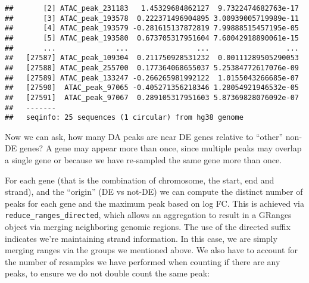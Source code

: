 \documentclass[
  9pt,
  a4paper,
]{extarticle}
\newenvironment{Shaded}{\begin{snugshade}}{\end{snugshade}}
\newcommand{\DataTypeTok}[1]{\textcolor[rgb]{0.13,0.29,0.53}{#1}}
\newcommand{\KeywordTok}[1]{\textcolor[rgb]{0.13,0.29,0.53}{\textbf{#1}}}
\newcommand{\NormalTok}[1]{#1}
\newcommand{\OperatorTok}[1]{\textcolor[rgb]{0.81,0.36,0.00}{\textbf{#1}}}
\newcommand{\StringTok}[1]{\textcolor[rgb]{0.31,0.60,0.02}{#1}}
\begin{document}
\begin{verbatim}
##       [2] ATAC_peak_231183   1.45329684862127  9.7322474682763e-17
##       [3] ATAC_peak_193578  0.222371496904895 3.00939005719989e-11
##       [4] ATAC_peak_193579 -0.281615137872819 7.99888515457195e-05
##       [5] ATAC_peak_193580  0.673705317951604 7.60042918890061e-15
##       ...              ...                ...                  ...
##   [27587] ATAC_peak_109304  0.211750928531232  0.00111289505290053
##   [27588] ATAC_peak_255700  0.177364068655037 5.25384772617076e-09
##   [27589] ATAC_peak_133247 -0.266265981992122  1.0155043266685e-07
##   [27590]  ATAC_peak_97065 -0.405271356218346 1.28054921946532e-05
##   [27591]  ATAC_peak_97067  0.289105317951603 5.87369828076092e-07
##   -------
##   seqinfo: 25 sequences (1 circular) from hg38 genome
\end{verbatim}

Now we can ask, how many DA peaks are near DE genes relative to ``other'' non-DE
genes? A gene may appear more than once, since multiple peaks may overlap a
single gene or because we have re-sampled the same gene more than once.

For each gene (that is the combination of chromosome, the start, end and
strand), and the ``origin'' (DE vs not-DE) we can compute the distinct number of
peaks for each gene and the maximum peak based on log FC. This is achieved via
\texttt{reduce\_ranges\_directed}, which allows an aggregation to result in a GRanges
object via merging neighboring genomic regions. The use of the directed suffix
indicates we're maintaining strand information. In this case, we are simply
merging ranges via the groups we mentioned above. We also have to account for
the number of resamples we have performed when counting if there are any peaks,
to ensure we do not double count the same peak:

\begin{Shaded}
\end{Shaded}
\end{document}
